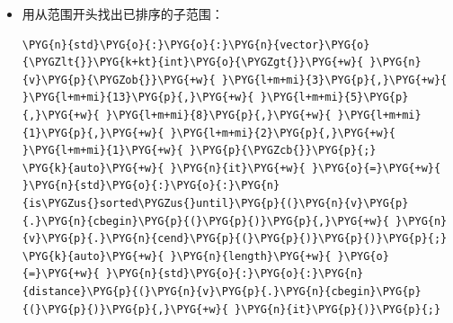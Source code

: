 \begin{itemize}
\begin{codeblockbg}
\begin{Verbatim}[commandchars=\\\{\},breaklines=true,breakanywhere=true,fontsize=\codefont,xleftmargin=17bp]
\PYG{n}{std}\PYG{o}{:}\PYG{o}{:}\PYG{n}{vector}\PYG{o}{\PYGZlt{}}\PYG{k+kt}{int}\PYG{o}{\PYGZgt{}}\PYG{+w}{ }\PYG{n}{v}\PYG{+w}{ }\PYG{p}{\PYGZob{}}\PYG{+w}{ }\PYG{l+m+mi}{1}\PYG{p}{,}\PYG{+w}{ }\PYG{l+m+mi}{1}\PYG{p}{,}\PYG{+w}{ }\PYG{l+m+mi}{2}\PYG{p}{,}\PYG{+w}{ }\PYG{l+m+mi}{3}\PYG{p}{,}\PYG{+w}{ }\PYG{l+m+mi}{5}\PYG{p}{,}\PYG{+w}{ }\PYG{l+m+mi}{8}\PYG{p}{,}\PYG{+w}{ }\PYG{l+m+mi}{13}\PYG{+w}{ }\PYG{p}{\PYGZcb{}}\PYG{p}{;}
\PYG{k}{auto}\PYG{+w}{ }\PYG{n}{sorted}\PYG{+w}{ }\PYG{o}{=}\PYG{+w}{ }\PYG{n}{std}\PYG{o}{:}\PYG{o}{:}\PYG{n}{is\PYGZus{}sorted}\PYG{p}{(}\PYG{n}{v}\PYG{p}{.}\PYG{n}{cbegin}\PYG{p}{(}\PYG{p}{)}\PYG{p}{,}\PYG{+w}{ }\PYG{n}{v}\PYG{p}{.}\PYG{n}{cend}\PYG{p}{(}\PYG{p}{)}\PYG{p}{)}\PYG{p}{;}
\PYG{n}{sorted}\PYG{+w}{ }\PYG{o}{=}\PYG{+w}{ }\PYG{n}{std}\PYG{o}{:}\PYG{o}{:}\PYG{n}{is\PYGZus{}sorted}\PYG{p}{(}\PYG{n}{v}\PYG{p}{.}\PYG{n}{cbegin}\PYG{p}{(}\PYG{p}{)}\PYG{p}{,}\PYG{+w}{ }\PYG{n}{v}\PYG{p}{.}\PYG{n}{cend}\PYG{p}{(}\PYG{p}{)}\PYG{p}{,}
\PYG{+w}{                        }\PYG{n}{std}\PYG{o}{:}\PYG{o}{:}\PYG{n}{greater}\PYG{o}{\PYGZlt{}}\PYG{o}{\PYGZgt{}}\PYG{p}{(}\PYG{p}{)}\PYG{p}{)}\PYG{p}{;}
\end{Verbatim}
\end{codeblockbg}



\item 用从范围开头找出已排序的子范围：



\begin{codeblockbg}
\begin{Verbatim}[commandchars=\\\{\},breaklines=true,breakanywhere=true,fontsize=\codefont,xleftmargin=17bp]
\PYG{n}{std}\PYG{o}{:}\PYG{o}{:}\PYG{n}{vector}\PYG{o}{\PYGZlt{}}\PYG{k+kt}{int}\PYG{o}{\PYGZgt{}}\PYG{+w}{ }\PYG{n}{v}\PYG{p}{\PYGZob{}}\PYG{+w}{ }\PYG{l+m+mi}{3}\PYG{p}{,}\PYG{+w}{ }\PYG{l+m+mi}{13}\PYG{p}{,}\PYG{+w}{ }\PYG{l+m+mi}{5}\PYG{p}{,}\PYG{+w}{ }\PYG{l+m+mi}{8}\PYG{p}{,}\PYG{+w}{ }\PYG{l+m+mi}{1}\PYG{p}{,}\PYG{+w}{ }\PYG{l+m+mi}{2}\PYG{p}{,}\PYG{+w}{ }\PYG{l+m+mi}{1}\PYG{+w}{ }\PYG{p}{\PYGZcb{}}\PYG{p}{;}
\PYG{k}{auto}\PYG{+w}{ }\PYG{n}{it}\PYG{+w}{ }\PYG{o}{=}\PYG{+w}{ }\PYG{n}{std}\PYG{o}{:}\PYG{o}{:}\PYG{n}{is\PYGZus{}sorted\PYGZus{}until}\PYG{p}{(}\PYG{n}{v}\PYG{p}{.}\PYG{n}{cbegin}\PYG{p}{(}\PYG{p}{)}\PYG{p}{,}\PYG{+w}{ }\PYG{n}{v}\PYG{p}{.}\PYG{n}{cend}\PYG{p}{(}\PYG{p}{)}\PYG{p}{)}\PYG{p}{;}
\PYG{k}{auto}\PYG{+w}{ }\PYG{n}{length}\PYG{+w}{ }\PYG{o}{=}\PYG{+w}{ }\PYG{n}{std}\PYG{o}{:}\PYG{o}{:}\PYG{n}{distance}\PYG{p}{(}\PYG{n}{v}\PYG{p}{.}\PYG{n}{cbegin}\PYG{p}{(}\PYG{p}{)}\PYG{p}{,}\PYG{+w}{ }\PYG{n}{it}\PYG{p}{)}\PYG{p}{;}
\end{Verbatim}
\end{codeblockbg}

\end{itemize}


